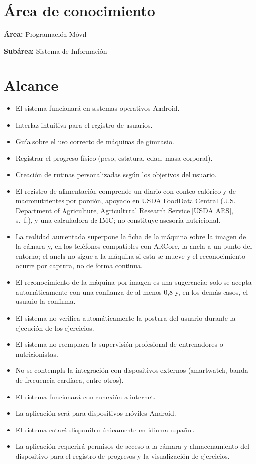 \section{Área de conocimiento}
\label{sec:area}

\textbf{Área:} Programación Móvil

\textbf{Subárea:} Sistema de Información

\section{Alcance}
\label{sec:alcance}

\begin{itemize}
    \item El sistema funcionará en sistemas operativos Android.
    \item Interfaz intuitiva para el registro de usuarios.
    \item Guía sobre el uso correcto de máquinas de gimnasio.
    \item Registrar el progreso físico (peso, estatura, edad, masa corporal).
    \item Creación de rutinas personalizadas según los objetivos del usuario.
    \item El registro de alimentación comprende un diario con conteo calórico y
    de macronutrientes por porción, apoyado en USDA FoodData Central (U.S. Department of Agriculture,
    Agricultural Research Service [USDA ARS], s.~f.), y una
    calculadora de IMC; no constituye asesoría nutricional.
    \item La realidad aumentada superpone la ficha de la máquina sobre la
    imagen de la cámara y, en los teléfonos compatibles con ARCore, la ancla a
    un punto del entorno; el ancla no sigue a la máquina si esta se mueve y el
    reconocimiento ocurre por captura, no de forma continua.
    \item El reconocimiento de la máquina por imagen es una sugerencia: solo se
    acepta automáticamente con una confianza de al menos 0,8 y, en los demás
    casos, el usuario la confirma.
    \item El sistema no verifica automáticamente la postura del usuario durante
    la ejecución de los ejercicios.
    \item El sistema no reemplaza la supervisión profesional de entrenadores o
    nutricionistas.
    \item No se contempla la integración con dispositivos externos (smartwatch,
    banda de frecuencia cardíaca, entre otros).
    \item El sistema funcionará con conexión a internet.
    \item La aplicación será para dispositivos móviles Android.
    \item El sistema estará disponible únicamente en idioma español.
    \item La aplicación requerirá permisos de acceso a la cámara y almacenamiento
    del dispositivo para el registro de progresos y la visualización de
    ejercicios.
\end{itemize}

